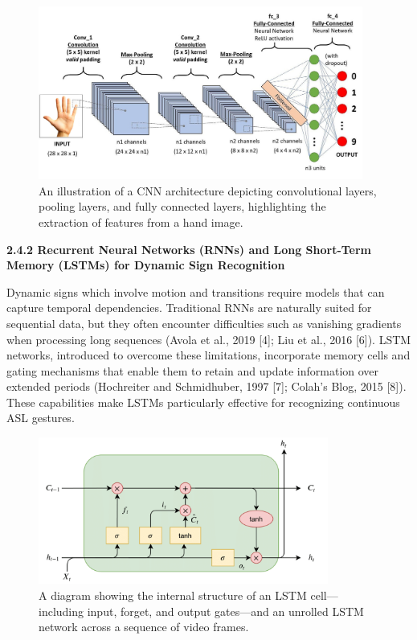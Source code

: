 \documentclass[12pt]{article}
\begin{document}
\begin{figure}[h!]
  \centering
  \includegraphics[width=0.95\textwidth]{cnn_architecture.png}
  \caption{An illustration of a CNN architecture depicting convolutional layers, pooling layers, and fully connected layers, highlighting the extraction of features from a hand image.}
  \label{fig:cnn_architecture}
\end{figure}

\vspace{1em}
\noindent
\textbf{2.4.2 Recurrent Neural Networks (RNNs) and Long Short-Term Memory (LSTMs) for Dynamic Sign Recognition}
\vspace{1em}

Dynamic signs which involve motion and transitions require models that can capture 
temporal dependencies. Traditional RNNs are naturally suited for sequential data, but 
they often encounter difficulties such as vanishing gradients when processing long sequences 
(Avola et al., 2019 [4]; Liu et al., 2016 [6]). LSTM networks, introduced to overcome these 
limitations, incorporate memory cells and gating mechanisms that enable them to retain 
and update information over extended periods (Hochreiter and Schmidhuber, 1997 [7]; Colah’s 
Blog, 2015 [8]). These capabilities make LSTMs particularly effective for recognizing 
continuous ASL gestures.

\begin{figure}[h!]
  \centering
  \includegraphics[width=0.85\textwidth]{lstm_architecture.png}
  \caption{A diagram showing the internal structure of an LSTM cell—including input, forget, and output gates—and an unrolled LSTM network across a sequence of video frames.}
  \label{fig:lstm_architecture}
\end{figure}
\end{document}
